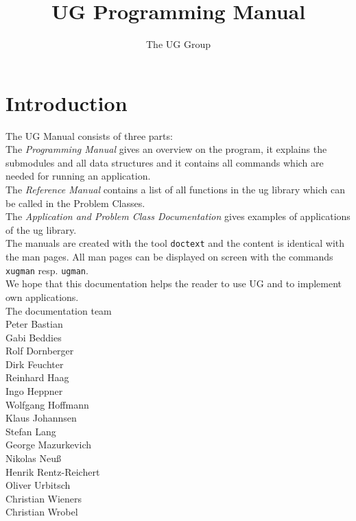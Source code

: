 


\pagestyle{myheadings}
\sloppy
\makeindex


\newcommand{\sectitle}{\mbox{}}
\setcounter{page}{0}

\title{UG Programming Manual}
\author{The UG Group}

\maketitle


\section*{Introduction}

The UG Manual consists of three parts:
\\[5mm]  
The {\em Programming Manual} gives an overview on the program, it
explains the submodules and all data structures and it contains
all commands which are needed for running an application.
\\[5mm]  
The {\em Reference Manual} contains a list of all 
functions in the ug library which can be called in the Problem Classes.
\\[5mm]
The {\em Application and Problem Class Documentation} gives examples
of applications of the ug library.
\\[5mm]
The manuals are created with the tool {\tt doctext} and the content is 
identical with the man pages. All man pages can be displayed on screen 
with the commands {\tt xugman} resp. {\tt ugman}.
\\[5mm]
We hope that this documentation helps the reader to use UG 
and to implement own applications.
\\[1cm]
The documentation team
\\[1cm]
Peter Bastian\\
Gabi Beddies\\
Rolf Dornberger\\
Dirk Feuchter\\
Reinhard Haag\\
Ingo Heppner\\
Wolfgang Hoffmann\\
Klaus Johannsen\\
Stefan Lang\\
George Mazurkevich\\
Nikolas Neu\ss\\
Henrik Rentz-Reichert\\
Oliver Urbitsch\\
Christian Wieners\\
Christian Wrobel

